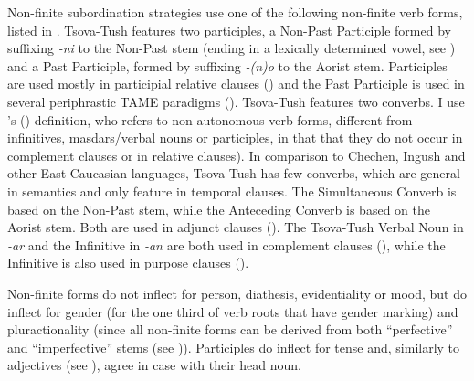Non-finite subordination strategies use one of the following non-finite verb forms, listed in . Tsova-Tush features two participles, a Non-Past Participle formed by suffixing \textit{-ni} to the Non-Past stem (ending in a lexically determined vowel, see ) and a Past Participle, formed by suffixing \textit{-(n)o} to the Aorist stem. Participles are used mostly in participial relative clauses () and the Past Participle is used in several periphrastic TAME paradigms (). Tsova-Tush features two converbs. I use \citeauthor{nedjalkov95converb}’s  (\citeyear{nedjalkov95converb}) definition, who refers to non-autonomous verb forms, different from infinitives, masdars/verbal nouns or participles, in that that they do not occur in complement clauses or in relative clauses). In comparison to Chechen, Ingush and other East Caucasian languages, Tsova-Tush has few converbs, which are general in semantics and only feature in temporal clauses. The Simultaneous Converb is based on the Non-Past stem, while the Anteceding Converb is based on the Aorist stem. Both are used in adjunct clauses (). The Tsova-Tush Verbal Noun in \textit{-ar} and the Infinitive in \textit{-an} are both used in complement clauses (), while the Infinitive is also used in purpose clauses ().

Non-finite forms do not inflect for person, diathesis, evidentiality or mood, but do inflect for gender (for the one third of verb roots that have gender marking) and pluractionality (since all non-finite forms can be derived from both ``perfective'' and ``imperfective'' stems (see )). Participles do inflect for tense and, similarly to adjectives (see ), agree in case with their head noun.

